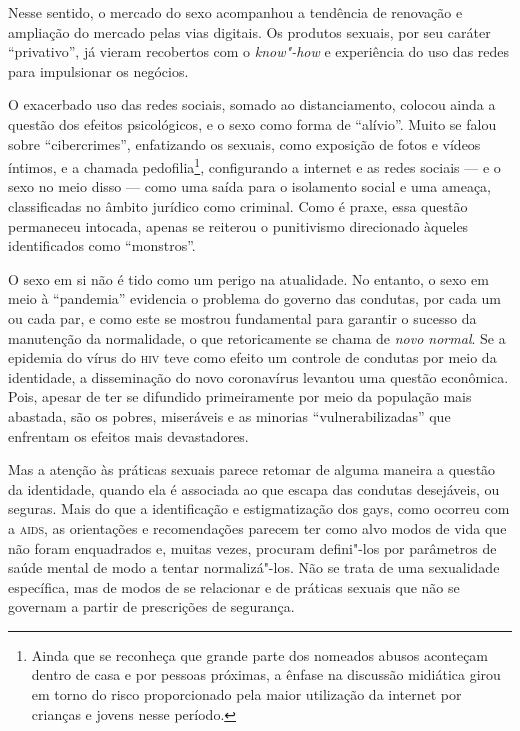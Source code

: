 Nesse sentido, o mercado do sexo acompanhou a tendência de renovação e
ampliação do mercado pelas vias digitais. Os produtos sexuais, por seu
caráter ``privativo'', já vieram recobertos com o \emph{know"-how} e
experiência do uso das redes para impulsionar os negócios.

O exacerbado uso das redes sociais, somado ao distanciamento, colocou
ainda a questão dos efeitos psicológicos, e o sexo como forma de
``alívio''. Muito se falou sobre ``cibercrimes'', enfatizando os
sexuais, como exposição de fotos e vídeos íntimos, e a chamada
pedofilia\footnote{Ainda que se reconheça que grande parte dos nomeados
  abusos aconteçam dentro de casa e por pessoas próximas, a ênfase na
  discussão midiática girou em torno do risco proporcionado pela maior
  utilização da internet por crianças e jovens nesse período.},
configurando a internet e as redes sociais --- e o sexo no meio disso ---
como uma saída para o isolamento social e uma ameaça, classificadas no
âmbito jurídico como criminal. Como é praxe, essa questão permaneceu
intocada, apenas se reiterou o punitivismo direcionado àqueles
identificados como ``monstros''.

O sexo em si não é tido como um perigo na atualidade. No entanto, o sexo
em meio à ``pandemia'' evidencia o problema do governo das condutas, por
cada um ou cada par, e como este se mostrou fundamental para garantir o
sucesso da manutenção da normalidade, o que retoricamente se chama de
\emph{novo normal}. Se a epidemia do vírus do \textsc{hiv} teve como efeito um
controle de condutas por meio da identidade, a disseminação do novo
coronavírus levantou uma questão econômica. Pois, apesar de ter se
difundido primeiramente por meio da população mais abastada, são os
pobres, miseráveis e as minorias ``vulnerabilizadas'' que enfrentam os
efeitos mais devastadores.

Mas a atenção às práticas sexuais parece retomar de alguma maneira a
questão da identidade, quando ela é associada ao que escapa das condutas
desejáveis, ou seguras. Mais do que a identificação e estigmatização dos
gays, como ocorreu com a \textsc{aids}, as orientações e recomendações parecem
ter como alvo modos de vida que não foram enquadrados e, muitas vezes,
procuram defini"-los por parâmetros de saúde mental de modo a tentar
normalizá"-los. Não se trata de uma sexualidade específica, mas de modos
de se relacionar e de práticas sexuais que não se governam a partir de
prescrições de segurança.

